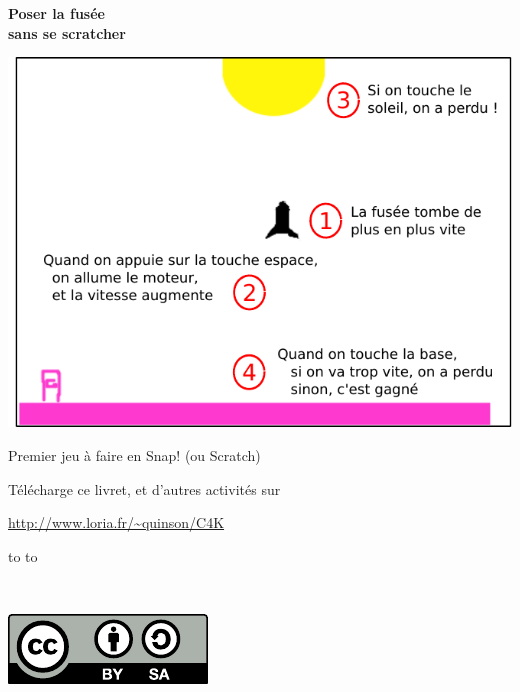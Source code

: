 \documentclass[a7paper,pagesize,DIV=14,10pt]{scrbook}
\newcommand{\snap}{Snap!\xspace}
\begin{document}
\begin{center}
  \textbf{{\huge Poser la fusée}\\
    \Large sans se scratcher}
\end{center}

\smallskip
\includegraphics[width=\textwidth]{img/fusee_but-du-jeu.pdf}

\medskip%
\centerline{Premier jeu à faire en \snap{} (ou Scratch)}
  
\vfill%
\begin{center}
\begin{spacing}{.8}
  \centerline{\footnotesize Télécharge ce livret, et d'autres activités sur}

  \centerline{\small\color{blue}\url{http://www.loria.fr/~quinson/C4K}}
\end{spacing}

\vspace{.2\baselineskip}
\begin{minipage}{.8\linewidth}
  \begin{spacing}{.5}
    \hbox to \linewidth{\tiny~\hfill Vous pouvez copier, modifier et diffuser librement ce document,}
    \hbox to \linewidth{\tiny~\hfill à la seule condition de laisser ces mêmes droits à vos lecteurs.}
  \end{spacing}
\end{minipage}%
~
\begin{minipage}[b]{.16\linewidth}
  \includegraphics[width=\linewidth]{img/logo_by-sa.pdf}
\end{minipage}%
\end{center}
\end{document}
